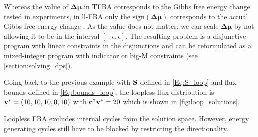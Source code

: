 Whereas the value of $\boldsymbol{\Delta \mu}$ in TFBA corresponds to the Gibbs free energy change tested in experiments, in ll-FBA only the $\text{sign}(\boldsymbol{\Delta \mu})$ corresponds to the actual Gibbs free energy change \cite{elimination_infeasible_loops}. 
As the value does not matter, we can scale $\boldsymbol{\Delta \mu}$ by not allowing it to be in the interval $[- \epsilon , \epsilon ]$.
The resulting problem is a disjunctive program with linear constraints in the disjunctions and can be reformulated as a mixed-integer program with indicator or big-M constraints (see \cref{section:solving_dps}). 


Going back to the previous example with $\bold S$ defined in \cref{Eq:S_loop} and flux bounds defined in \cref{Eq:bounds_loop},  
the loopless flux distribution is $\bold v^* = (10,10,10,0,10)$ with $\bold c^\intercal \bold v^* = 20$ which is shown in \cref{fig:loop_solutions}. 

Loopless FBA excludes internal cycles from the solution space. However, energy generating cycles still have to be blocked by restricting the directionality.

